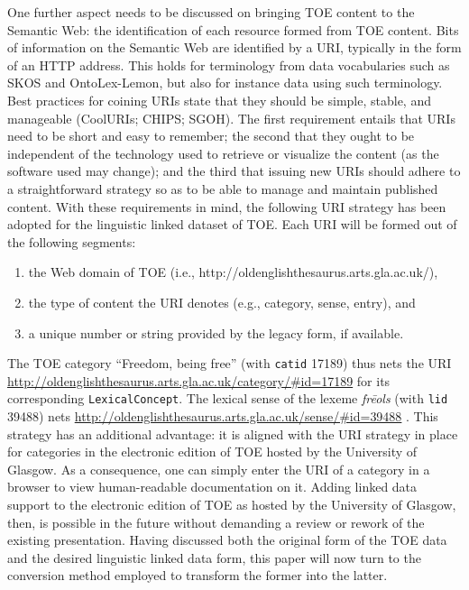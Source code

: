 One further aspect needs to be discussed on bringing TOE content to the Semantic Web: the identification of each resource formed from TOE content. Bits of information on the Semantic Web are identified by a URI, typically in the form of an HTTP address. This holds for terminology from data vocabularies such as SKOS and OntoLex-Lemon, but also for instance data using such terminology. Best practices for coining URIs state that they should be simple, stable, and manageable (CoolURIs; CHIPS; SGOH). The first requirement entails that URIs need to be short and easy to remember; the second that they ought to be independent of the technology used to retrieve or visualize the content (as the software used may change); and the third that issuing new URIs should adhere to a straightforward strategy so as to be able to manage and maintain published content. With these requirements in mind, the following URI strategy has been adopted for the linguistic linked dataset of TOE. Each URI will be formed out of the following segments:
\begin{enumerate}
\item the Web domain of TOE (i.e., http://oldenglishthesaurus.arts.gla.ac.uk/), 
\item the type of content the URI denotes (e.g., category, sense, entry), and
\item a unique number or string provided by the legacy form, if available.
\end{enumerate}
The TOE category “Freedom, being free” (with  \texttt{catid} 17189) thus nets the URI \url{http://oldenglishthesaurus.arts.gla.ac.uk/category/#id=17189} for its corresponding  \texttt{LexicalConcept}. The lexical sense of the lexeme \textit{frēols} (with  \texttt{lid} 39488) nets \url{http://oldenglishthesaurus.arts.gla.ac.uk/sense/#id=39488} . This strategy has an additional advantage: it is aligned with the URI strategy in place for categories in the electronic edition of TOE hosted by the University of Glasgow. As a consequence, one can simply enter the URI of a category in a browser to view human-readable documentation on it. Adding linked data support to the electronic edition of TOE as hosted by the University of Glasgow, then, is possible in the future without demanding a review or rework of the existing presentation. Having discussed both the original form of the TOE data and the desired linguistic linked data form, this paper will now turn to the conversion method employed to transform the former into the latter.

